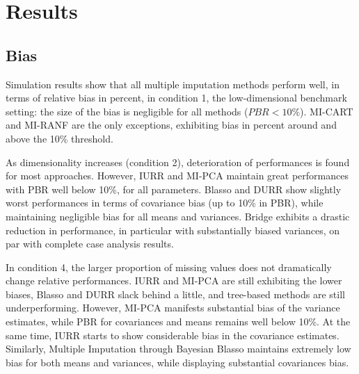\maketitle
\section{Results}

\subsection{Bias}

Simulation results show that all multiple imputation methods perform well, in terms of relative bias in percent, in condition 1, 
the low-dimensional benchmark setting: the size of the bias is negligible for all methods ($PBR < 10\%$). MI-CART 
and MI-RANF are the only exceptions, exhibiting bias in percent around and above the 10\% threshold.

As dimensionality increases (condition 2), deterioration of performances is found for most approaches. 
However, IURR and MI-PCA maintain great performances with PBR well below 10\%, for all parameters. Blasso
and DURR show slightly worst performances in terms of covariance bias (up to 10\% in PBR), while maintaining negligible bias 
for all means and variances. Bridge exhibits a drastic reduction in performance, in particular with substantially biased 
variances, on par with complete case analysis results.

In condition 4, the larger proportion of missing values does not dramatically change relative performances.
IURR and MI-PCA are still exhibiting the lower biases, Blasso and DURR slack behind a little, and tree-based 
methods are still underperforming. However, MI-PCA manifests substantial bias of the variance estimates, while 
PBR for covariances and means remains well below 10\%. At the same time, IURR starts to show considerable 
bias in the covariance estimates. Similarly, Multiple Imputation through Bayesian Blasso maintains extremely 
low bias for both means and variances, while displaying substantial covariances bias.


